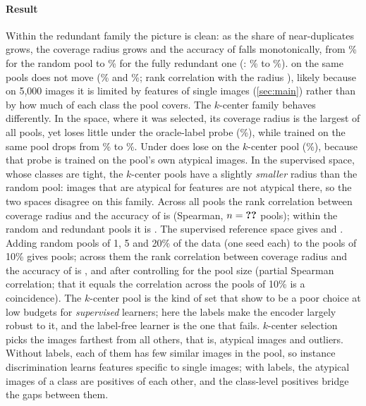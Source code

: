 \paragraph{Result}
Within the redundant family the picture is clean: as the share of near-duplicates grows, the
coverage radius grows and the accuracy of \supcon falls monotonically, from \%
for the random pool to \% for the fully redundant one
(\lpfive: \% to \%). \simclr on the same
pools does not move (\% and \%; rank
correlation with the radius ), likely because on 5,000 images it is limited by
features of single images (\cref{sec:main}) rather than by how much of each class the pool covers. The
$k$-center family behaves differently. In the \simclr space, where it was selected, its coverage radius is
the largest of all pools, yet \supcon loses little under the oracle-label probe
(\%), while \simclr trained on the same pool drops from
\% to \%. Under \lpfive \supcon does lose
on the $k$-center pool (\%), because that probe is trained on the
pool's own atypical images. In the supervised space, whose classes are tight, the $k$-center pools have a
slightly \emph{smaller} radius than the random pool: images that are atypical for \simclr features are not
atypical there, so the two spaces disagree on this family. Across all pools the rank correlation between
coverage radius and the accuracy of \supcon is  (Spearman,
$n=\R{rho:all:radius_simclr:supcon:n}$ pools); within the random and redundant pools it is
. The supervised reference space gives 
and . Adding random pools of 1, 5 and 20\% of the data (one seed each) to the
 pools of 10\% gives  pools; across them the rank correlation
between coverage radius and the accuracy of \supcon is , and  after
controlling for the pool size (partial Spearman correlation; that it equals the correlation across the pools
of 10\% is a coincidence). The $k$-center pool is the kind of set that \citet{hacohen2022active} show to be a poor
choice at low budgets for \emph{supervised} learners; here the labels make the \supcon encoder largely
robust to it, and the label-free learner is the one that fails. $k$-center selection picks the images farthest from all others,
that is, atypical images and outliers. Without labels, each of them has few similar images in the pool, so
instance discrimination learns features specific to single images; with labels, the atypical images of a
class are positives of each other, and the class-level positives bridge the gaps between them.

